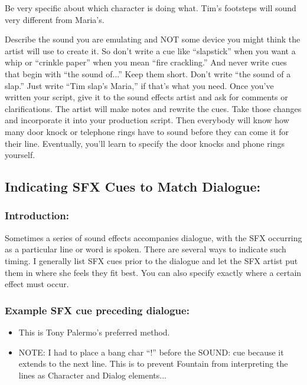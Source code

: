 \documentclass[openleft,oneside,showtrims]{memoir}
\begin{document}
Be very specific about which character is doing what. Tim's footsteps will sound very different from Maria's.

Describe the sound you are emulating and NOT some device you might think the artist will use to create it. So don't write a cue like ``slapstick'' when you want a whip or ``crinkle paper'' when you mean ``fire crackling.'' And never write cues that begin with ``the sound of...'' Keep them short. Don't write ``the sound of a slap.'' Just write ``Tim slap's Maria,'' if that's what you need. Once you've written your script, give it to the sound effects artist and ask for comments or clarifications. The artist will make notes and rewrite the cues. Take those changes and incorporate it into your production script. Then everybody will know how many door knock or telephone rings have to sound before they can come it for their line. Eventually, you'll learn to specify the door knocks and phone rings yourself.

\subsection{Indicating SFX Cues to Match Dialogue:}
\label{sec:orgc2c73bf}
\subsubsection*{Introduction:}
\label{sec:org70efd46}

Sometimes a series of sound effects accompanies dialogue, with the SFX occurring as a particular line or word is spoken. There are several ways to indicate such timing. I generally list SFX cues prior to the dialogue and let the SFX artist put them in where she feels they fit best. You can also specify exactly where a certain effect must occur.

\subsubsection*{Example SFX cue preceding dialogue:}
\label{sec:orga1bd115}

\begin{itemize}
\item This is Tony Palermo's preferred method.

\item NOTE: I had to place a bang char ``!'' before the SOUND: cue because it extends to the next line.  This is to prevent Fountain from interpreting the lines as Character and Dialog elements...
\end{itemize}
\end{document}
